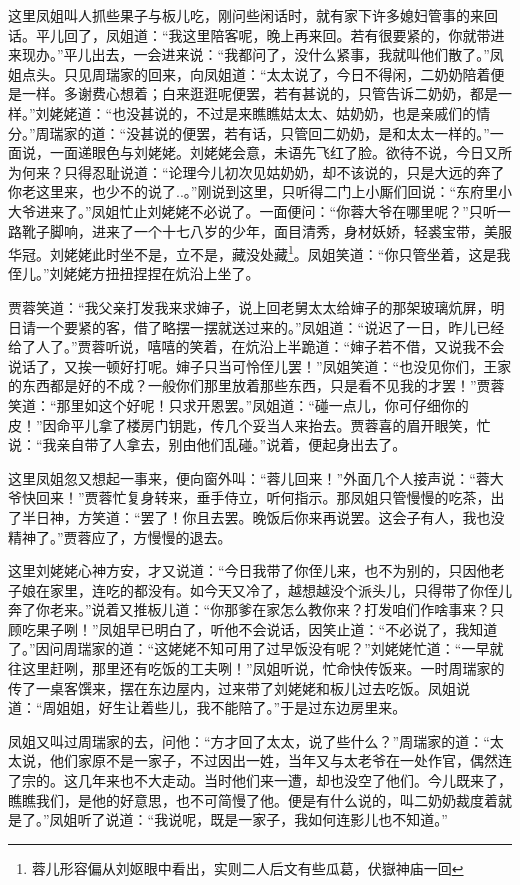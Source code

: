 \documentclass[12pt,oneside]{book}
\begin{document}
这里凤姐叫人抓些果子与板儿吃，刚问些闲话时，就有家下许多媳妇管事的来回话。平儿回了，凤姐道：“我这里陪客呢，晚上再来回。若有很要紧的，你就带进来现办。”平儿出去，一会进来说：“我都问了，没什么紧事，我就叫他们散了。”凤姐点头。只见周瑞家的回来，向凤姐道：“太太说了，今日不得闲，二奶奶陪着便是一样。多谢费心想着；白来逛逛呢便罢，若有甚说的，只管告诉二奶奶，都是一样。”刘姥姥道：“也没甚说的，不过是来瞧瞧姑太太、姑奶奶，也是亲戚们的情分。”周瑞家的道：“没甚说的便罢，若有话，只管回二奶奶，是和太太一样的。”一面说，一面递眼色与刘姥姥。刘姥姥会意，未语先飞红了脸。欲待不说，今日又所为何来？只得忍耻说道：“论理今儿初次见姑奶奶，却不该说的，只是大远的奔了你老这里来，也少不的说了..。”刚说到这里，只听得二门上小厮们回说：“东府里小大爷进来了。”凤姐忙止刘姥姥不必说了。一面便问：“你蓉大爷在哪里呢？”只听一路靴子脚响，进来了一个十七八岁的少年，面目清秀，身材妖娇，轻裘宝带，美服华冠。刘姥姥此时坐不是，立不是，藏没处藏\footnote{蓉儿形容偏从刘妪眼中看出，实则二人后文有些瓜葛，伏嶽神庙一回}。凤姐笑道：“你只管坐着，这是我侄儿。”刘姥姥方扭扭捏捏在炕沿上坐了。

贾蓉笑道：“我父亲打发我来求婶子，说上回老舅太太给婶子的那架玻璃炕屏，明日请一个要紧的客，借了略摆一摆就送过来的。”凤姐道：“说迟了一日，昨儿已经给了人了。”贾蓉听说，嘻嘻的笑着，在炕沿上半跪道：“婶子若不借，又说我不会说话了，又挨一顿好打呢。婶子只当可怜侄儿罢！”凤姐笑道：“也没见你们，王家的东西都是好的不成？一般你们那里放着那些东西，只是看不见我的才罢！”贾蓉笑道：“那里如这个好呢！只求开恩罢。”凤姐道：“碰一点儿，你可仔细你的皮！”因命平儿拿了楼房门钥匙，传几个妥当人来抬去。贾蓉喜的眉开眼笑，忙说：“我亲自带了人拿去，别由他们乱碰。”说着，便起身出去了。

这里凤姐忽又想起一事来，便向窗外叫：“蓉儿回来！”外面几个人接声说：“蓉大爷快回来！”贾蓉忙复身转来，垂手侍立，听何指示。那凤姐只管慢慢的吃茶，出了半日神，方笑道：“罢了！你且去罢。晚饭后你来再说罢。这会子有人，我也没精神了。”贾蓉应了，方慢慢的退去。

这里刘姥姥心神方安，才又说道：“今日我带了你侄儿来，也不为别的，只因他老子娘在家里，连吃的都没有。如今天又冷了，越想越没个派头儿，只得带了你侄儿奔了你老来。”说着又推板儿道：“你那爹在家怎么教你来？打发咱们作啥事来？只顾吃果子咧！”凤姐早已明白了，听他不会说话，因笑止道：“不必说了，我知道了。”因问周瑞家的道：“这姥姥不知可用了过早饭没有呢？”刘姥姥忙道：“一早就往这里赶咧，那里还有吃饭的工夫咧！”凤姐听说，忙命快传饭来。一时周瑞家的传了一桌客馔来，摆在东边屋内，过来带了刘姥姥和板儿过去吃饭。凤姐说道：“周姐姐，好生让着些儿，我不能陪了。”于是过东边房里来。

凤姐又叫过周瑞家的去，问他：“方才回了太太，说了些什么？”周瑞家的道：“太太说，他们家原不是一家子，不过因出一姓，当年又与太老爷在一处作官，偶然连了宗的。这几年来也不大走动。当时他们来一遭，却也没空了他们。今儿既来了，瞧瞧我们，是他的好意思，也不可简慢了他。便是有什么说的，叫二奶奶裁度着就是了。”凤姐听了说道：“我说呢，既是一家子，我如何连影儿也不知道。”
\end{document}
